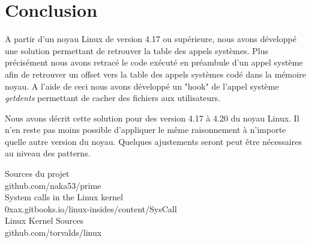 \documentclass[journal, a4paper]{IEEEtran}
\begin{document}
\section{Conclusion}

A partir d'un noyau Linux de version 4.17 ou supérieure, nous avons développé une solution permettant de retrouver la table des appels systèmes. Plus précisément nous avons retracé le code exécuté en préambule d'un appel système afin de retrouver un offset vers la table des appels systèmes codé dans la mémoire noyau. A l'aide de ceci nous avons développé un "hook" de l'appel système \textit{getdents} permettant de cacher des fichiers aux utilisateurs.

Nous avons décrit cette solution pour des version 4.17 à 4.20 du noyau Linux. Il n'en reste pas moins possible d'appliquer le même raisonnement à n'importe quelle autre version du noyau. Quelques ajustements seront peut être nécessaires au niveau des patterns.

\begin{thebibliography}{}
	Sources du projet\\
	github.com/naka53/prime\\

	System calls in the Linux kernel\\
	0xax.gitbooks.io/linux-insides/content/SysCall\\

	Linux Kernel Sources\\
	github.com/torvalds/linux\\
\end{thebibliography}
\end{document}
